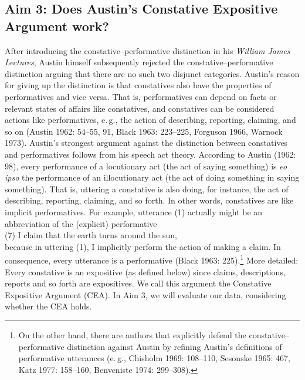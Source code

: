 \documentclass[egregdoesnotlikesansseriftitles,12pt]{scrartcl}
\begin{document}
\subsection{Aim 3: Does Austin's Constative Expositive Argument work?}
After introducing the constative--performative distinction in his \textit{William James Lectures}, Austin himself subsequently rejected the constative--performative distinction arguing that there are no such two disjunct categories. Austin's reason for giving up the distinction is that constatives also have the properties of performatives and vice versa. That is, performatives can depend on facts or relevant states of affairs like constatives, and constatives can be considered actions like performatives, e.\,g., the action of describing, reporting, claiming, and so on (Austin 1962: 54--55, 91, Black 1963: 223--225, Forguson 1966, Warnock 1973). Austin's strongest argument against the distinction between constatives and performatives follows from his speech act theory. According to Austin (1962: 98), every performance of a locutionary act (the act of saying something) is \textit{eo ipso} the performance of an illocutionary act (the act of doing something in saying something). That is, uttering a constative is also doing, for instance, the act of describing, reporting, claiming, and so forth. In other words, constatives are like implicit performatives. For example, utterance (1) actually might be an abbreviation of the (explicit) performative\\

(7) I claim that the earth turns around the sun,\\

\noindent because in uttering (1), I implicitly perform the action of making a claim. In consequence, every utterance is a performative (Black 1963: 225).\footnote{On the other hand, there are authors that explicitly defend the constative--performative distinction against Austin by refining Austin’s definitions of performative utterances (e.\,g., Chisholm 1969: 108--110, Sesonske 1965: 467, Katz 1977: 158--160, Benveniste 1974: 299--308).} More detailed: Every constative is an expositive (as defined below) since claims, descriptions, reports and so forth are expositives. We call this argument the Constative Expositive Argument (CEA). In Aim 3, we will evaluate our data, considering whether the CEA holds.


\end{document}
